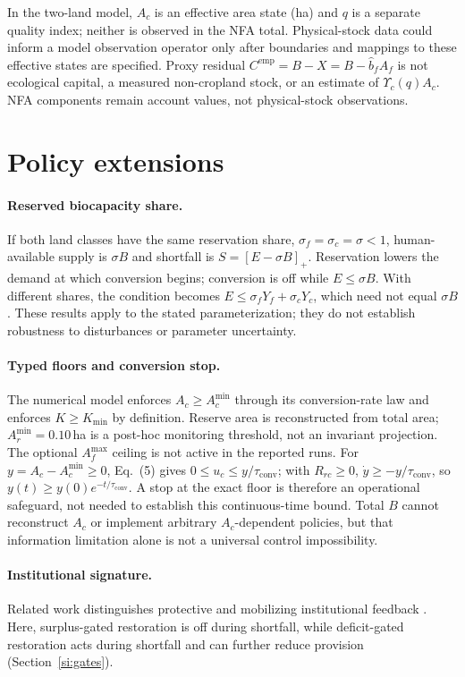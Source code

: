 \documentclass[11pt,a4paper]{article}
\newcommand{\Ups}{\Upsilon_c}
\newcommand{\Acmin}{A_c^{\min}}
\newcommand{\tconv}{\tau_{\mathrm{conv}}}
\begin{document}
In the two-land model, $A_c$ is an effective area state (ha) and $q$ is a separate quality index; neither is observed in the NFA total. Physical-stock data could inform a model observation operator only after boundaries and mappings to these effective states are specified. Proxy residual $C^{\mathrm{emp}}=B-X=B-\hat b_fA_f$ is not ecological capital, a measured non-cropland stock, or an estimate of $\Ups(q)A_c$. NFA components remain account values, not physical-stock observations.
\section{Policy extensions}\label{si:policy}

\paragraph{Reserved biocapacity share.} If both land classes have the same reservation share, $\sigma_f=\sigma_c=\sigma<1$, human-available supply is $\sigma B$ and shortfall is $S=[E-\sigma B]_+$. Reservation lowers the demand at which conversion begins; conversion is off while $E\le\sigma B$. With different shares, the condition becomes $E\le\sigma_fY_f+\sigma_cY_c$, which need not equal $\sigma B$. These results apply to the stated parameterization; they do not establish robustness to disturbances or parameter uncertainty.

\paragraph{Typed floors and conversion stop.} The numerical model enforces $A_c\ge\Acmin$ through its conversion-rate law and enforces $K\ge K_{\min}$ by definition. Reserve area is reconstructed from total area; $A_r^{\min}=0.10$\,ha is a post-hoc monitoring threshold, not an invariant projection. The optional $A_f^{\max}$ ceiling is not active in the reported runs. For $y=A_c-\Acmin\ge0$, Eq.~(5) gives $0\le u_c\le y/\tconv$; with $R_{rc}\ge0$, $\dot y\ge-y/\tconv$, so $y(t)\ge y(0)e^{-t/\tconv}$. A stop at the exact floor is therefore an operational safeguard, not needed to establish this continuous-time bound. Total $B$ cannot reconstruct $A_c$ or implement arbitrary $A_c$-dependent policies, but that information limitation alone is not a universal control impossibility.

\paragraph{Institutional signature.} Related work distinguishes protective and mobilizing institutional feedback \citep{Abaee2026a}. Here, surplus-gated restoration is off during shortfall, while deficit-gated restoration acts during shortfall and can further reduce provision (Section~\ref{si:gates}).
\end{document}
